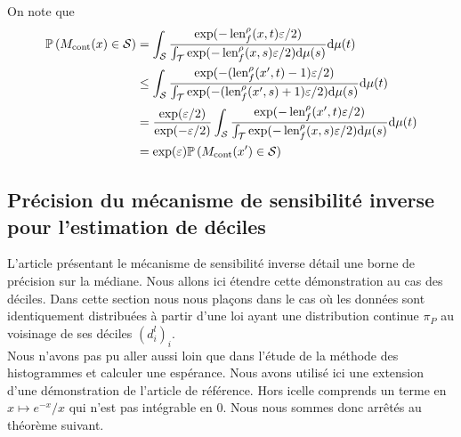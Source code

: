 On note que 
\begin{align*}
    \mathbb P\left( M_{\text{cont}}(x) \in \mathcal S \right) & = \int_\mathcal S \dfrac{\exp(-\operatorname{len}_f^\rho(x, t)\varepsilon/2)}{\int_\mathcal T \exp(-\operatorname{len}_f^\rho(x, s)\varepsilon/2)\mathrm{d} \mu(s)}    \mathrm{d} \mu(t)\\
    & \leq \int_\mathcal S \dfrac{\exp(-(\operatorname{len}_f^\rho(x', t)-1)\varepsilon/2)}{\int_\mathcal T \exp(-(\operatorname{len}_f^\rho(x', s)+1)\varepsilon/2)\mathrm{d} \mu(s)}    \mathrm{d} \mu(t)\\
    & = \dfrac{\exp(\varepsilon/2)}{\exp(-\varepsilon/2)}\int_\mathcal S \dfrac{\exp(-\operatorname{len}_f^\rho(x', t)\varepsilon/2)}{\int_\mathcal T \exp(-\operatorname{len}_f^\rho(x, s)\varepsilon/2)\mathrm{d} \mu(s)}    \mathrm{d} \mu(t)\\
    & = \exp(\varepsilon) \mathbb P\left( M_{\text{cont}}(x') \in \mathcal S \right)
\end{align*}


\subsection{Précision du mécanisme de sensibilité inverse pour l'estimation de déciles}



L'article présentant le mécanisme de sensibilité inverse \cite{Asi2020NearII} détail une borne de précision sur la médiane. Nous allons ici étendre cette démonstration au cas des déciles. Dans cette section nous nous plaçons dans le cas où les données sont identiquement distribuées à partir d'une loi ayant une distribution continue \(\pi_P\) au voisinage de ses déciles \((d_i^l)_i\).\\

Nous n'avons pas pu aller aussi loin que dans l'étude de la méthode des histogrammes et calculer une espérance. Nous avons utilisé ici une extension d'une démonstration de l'article de référence. Hors icelle comprends un terme en \(x \mapsto e^{-x}/x\) qui n'est pas intégrable en 0. Nous nous sommes donc arrêtés au théorème suivant.\\



